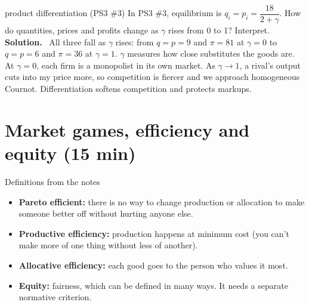 \documentclass[11pt]{article}
\newcommand{\soln}{\tcblower\textbf{Solution.}\ }
\begin{document}
\begin{examq}{product differentiation (PS3 \#3)}
In PS3 \#3, equilibrium is $q_i=p_i=\dfrac{18}{2+\gamma}$. How do quantities, prices and profits change as $\gamma$ rises from 0 to 1? Interpret.
\soln
All three fall as $\gamma$ rises: from $q=p=9$ and $\pi=81$ at $\gamma=0$ to $q=p=6$ and $\pi=36$ at $\gamma=1$. $\gamma$ measures how close substitutes the goods are. At $\gamma=0$, each firm is a monopolist in its own market. As $\gamma\to1$, a rival's output cuts into my price more, so competition is fiercer and we approach homogeneous Cournot. Differentiation softens competition and protects markups.
\end{examq}

\section{Market games, efficiency and equity (15 min)}

\begin{defbox}{Definitions from the notes}
\begin{itemize}
\item \textbf{Pareto efficient:} there is no way to change production or allocation to make someone better off without hurting anyone else.
\item \textbf{Productive efficiency:} production happens at minimum cost (you can't make more of one thing without less of another).
\item \textbf{Allocative efficiency:} each good goes to the person who values it most.
\item \textbf{Equity:} fairness, which can be defined in many ways. It needs a separate normative criterion.
\end{itemize}
\end{defbox}
\end{document}
